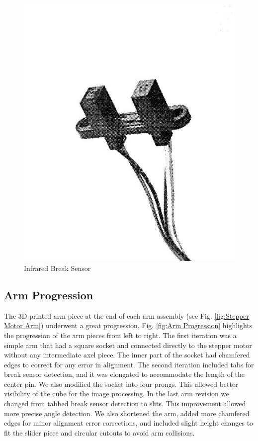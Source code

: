 \documentclass[final, letterpaper, 10 pt, conference, twocolumn]{IEEEtran}
\begin{document}
\begin{figure}[!ht]
\centering
\includegraphics[scale=0.28]{InfraredBreakSensor.jpg}
\caption{Infrared Break Sensor}
\label{fig:Infrared Break Sensor}
\end{figure}

\subsection{Arm Progression}
\label{sec:Arm Progression}
The 3D printed arm piece at the end of each arm assembly (see Fig. \ref{fig:Stepper Motor Arm}) underwent a great progression. Fig. \ref{fig:Arm Progression} highlights the progression of the arm pieces from left to right. The first iteration was a simple arm that had a square socket and connected directly to the stepper motor without any intermediate axel piece.  The inner part of the socket had chamfered edges to correct for any error in alignment.  The second iteration included tabs for break sensor detection, and it was elongated to accommodate the length of the center pin.  We also modified the socket into four prongs. This allowed better visibility of the cube for the image processing. In the last arm revision we changed from tabbed break sensor detection to slits. This improvement allowed more precise angle detection.  We also shortened the arm, added more chamfered edges for minor alignment error corrections, and included slight height changes to fit the slider piece and circular cutouts to avoid arm collisions.
\end{document}
